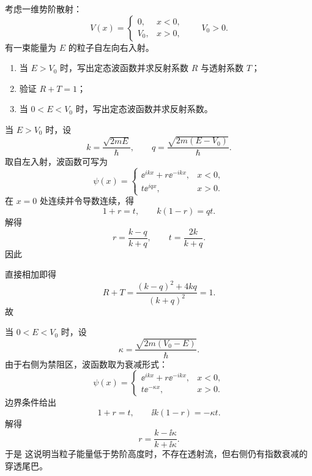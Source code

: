 \begin{question}
考虑一维势阶散射：
\[
V(x)=
\begin{cases}
0,& x<0,\\
V_0,& x>0,
\end{cases}
\qquad V_0>0.
\]
有一束能量为 $E$ 的粒子自左向右入射。

\begin{enumerate}[label=(\arabic*),leftmargin=2.5em]
  \item 当 $E>V_0$ 时，写出定态波函数并求反射系数 $R$ 与透射系数 $T$；
  \item 验证 $R+T=1$；
  \item 当 $0<E<V_0$ 时，写出定态波函数并求反射系数。
\end{enumerate}

\begin{solution}
当 $E>V_0$ 时，设
\[
k=\frac{\sqrt{2mE}}{\hbar},
\qquad
q=\frac{\sqrt{2m(E-V_0)}}{\hbar}.
\]
取自左入射，波函数可写为
\[
\psi(x)=
\begin{cases}
\ee^{ikx}+r \ee^{-ikx},& x<0,\\
t \ee^{iqx},& x>0.
\end{cases}
\]
在 $x=0$ 处连续并令导数连续，得
\[
1+r=t,
\qquad
k(1-r)=qt.
\]
解得
\[
r=\frac{k-q}{k+q},
\qquad
t=\frac{2k}{k+q}.
\]
因此

直接相加即得
\[
R+T=\frac{(k-q)^2+4kq}{(k+q)^2}=1.
\]
故

当 $0<E<V_0$ 时，设
\[
\kappa=\frac{\sqrt{2m(V_0-E)}}{\hbar}.
\]
由于右侧为禁阻区，波函数取为衰减形式：
\[
\psi(x)=
\begin{cases}
\ee^{ikx}+r \ee^{-ikx},& x<0,\\
t \ee^{-\kappa x},& x>0.
\end{cases}
\]
边界条件给出
\[
1+r=t,
\qquad
\ii k(1-r)=-\kappa t.
\]
解得
\[
r=\frac{k-\ii\kappa}{k+\ii\kappa}.
\]
于是
这说明当粒子能量低于势阶高度时，不存在透射流，但右侧仍有指数衰减的穿透尾巴。
\end{solution}
\end{question}

